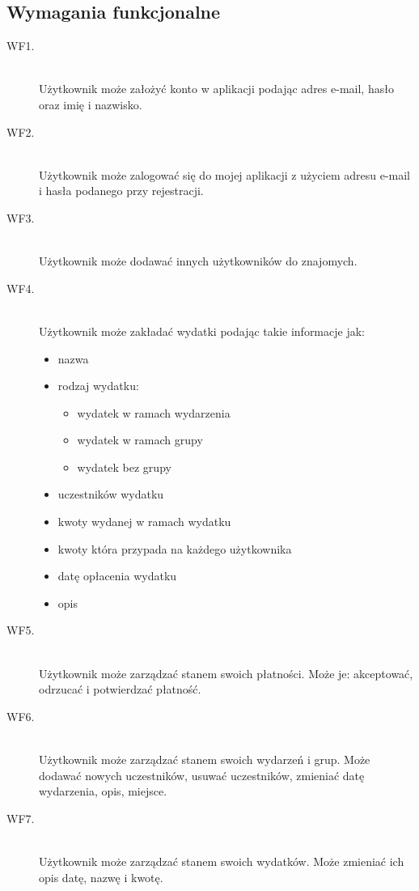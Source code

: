 \subsection{Wymagania funkcjonalne}
\begin{description}
  \item[WF1.] \hfill \\ Użytkownik może założyć konto w aplikacji podając adres e-mail, hasło oraz imię i nazwisko.
  \item[WF2.] \hfill \\ Użytkownik może zalogować się do mojej aplikacji z użyciem adresu e-mail i hasła podanego przy rejestracji.
  \item[WF3.] \hfill \\ Użytkownik może dodawać innych użytkowników do znajomych.
  \item[WF4.] \hfill \\ Użytkownik może zakładać wydatki podając takie informacje jak:
    \begin{itemize}
      \item nazwa
      \item rodzaj wydatku:
        \begin{itemize}
          \item wydatek w ramach wydarzenia
          \item wydatek w ramach grupy
          \item wydatek bez grupy
        \end{itemize}
      \item uczestników wydatku
      \item kwoty wydanej w ramach wydatku
      \item kwoty która przypada na każdego użytkownika
      \item datę opłacenia wydatku
      \item opis
    \end{itemize}
  \item[WF5.] \hfill \\ Użytkownik może zarządzać stanem swoich płatności. Może je: akceptować, odrzucać i potwierdzać płatność.
  \item[WF6.] \hfill \\ Użytkownik może zarządzać stanem swoich wydarzeń i grup. Może dodawać nowych uczestników, usuwać uczestników, zmieniać datę wydarzenia, opis, miejsce.
  \item[WF7.] \hfill \\ Użytkownik może zarządzać stanem swoich wydatków. Może zmieniać ich opis datę, nazwę i kwotę.

\end{description}
